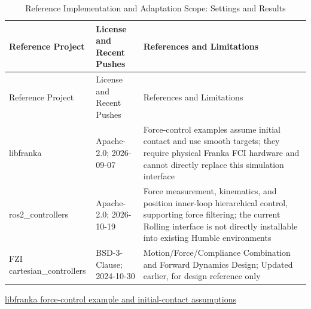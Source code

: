 \FloatBarrier\begingroup\small\setlength{\tabcolsep}{2.5pt}
\begin{longtable}[]{@{}
  >{\raggedright\arraybackslash}p{}
  >{\raggedright\arraybackslash}p{}
  >{\raggedright\arraybackslash}p{}@{}}
\caption{Reference Implementation and Adaptation Scope: Settings and Results}\label{tab:s12-1}\tabularnewline
\toprule\noalign{}
\begin{minipage}[b]{\linewidth}\raggedright
Reference Project
\end{minipage} & \begin{minipage}[b]{\linewidth}\raggedright
License and Recent Pushes
\end{minipage} & \begin{minipage}[b]{\linewidth}\raggedright
References and Limitations
\end{minipage} \\
\midrule\noalign{}
\endfirsthead
\toprule\noalign{}
\begin{minipage}[b]{\linewidth}\raggedright
Reference Project
\end{minipage} & \begin{minipage}[b]{\linewidth}\raggedright
License and Recent Pushes
\end{minipage} & \begin{minipage}[b]{\linewidth}\raggedright
References and Limitations
\end{minipage} \\
\midrule\noalign{}
\endhead
\bottomrule\noalign{}
\endlastfoot
libfranka & Apache-2.0; 2026-09-07 & Force-control examples assume initial contact and use smooth targets; they require physical Franka FCI hardware and cannot directly replace this simulation interface \\
ros2\_controllers & Apache-2.0; 2026-10-19 & Force measurement, kinematics, and position inner-loop hierarchical control, supporting force filtering; the current Rolling interface is not directly installable into existing Humble environments \\
FZI cartesian\_controllers & BSD-3-Clause; 2024-10-30 & Motion/Force/Compliance Combination and Forward Dynamics Design; Updated earlier, for design reference only \\
\end{longtable}\endgroup

\href{https://frankarobotics.github.io/libfranka/0.16.1/force_control_8cpp-example.html}{libfranka force-control example and initial-contact assumptions}

